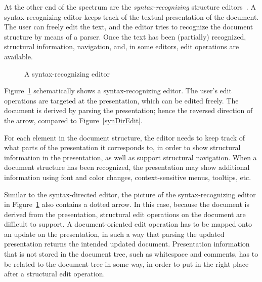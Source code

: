 
At the other end of the spectrum are the {\em syntax-recognizing} structure editors~\cite{budinsky85sre, ballance92pan}. A syntax-recognizing editor keeps track of the textual presentation of the document. The user can freely edit the text, and the editor tries to recognize the document structure by means of a parser. Once the text has been (partially) recognized, structural information, navigation, and, in some editors, edit operations are available.

\begin{figure}
\begin{small}
\begin{center}
\begin{center}
\begin{small}
\noindent
{}
\end{small}
\end{center}\caption{A syntax-recognizing editor}\label{synRecEdit} 
\end{center}
\end{small}
\end{figure}

Figure~\ref{synRecEdit} schematically shows a syntax-recognizing editor. The user's edit operations are targeted at the presentation, which can be edited freely. The document is derived by parsing the presentation; hence the reversed direction of the arrow, compared to Figure~\ref{synDirEdit}.

For each element in the document structure, the editor needs to keep track of what parts of the presentation it corresponds to, in order to show structural information in the presentation, as well as support structural navigation.  When a document structure has been recognized, the presentation may show additional information using font and color changes, context-sensitive menus, tooltips, etc.

Similar to the syntax-directed editor, the picture of the syntax-recognizing editor in Figure~\ref{synRecEdit} also contains a dotted arrow. In this case, because the document is derived from the presentation, structural edit operations on the document are difficult to support. A document-oriented edit operation has to be mapped onto an update on the presentation, in such a way that parsing the updated presentation returns the intended updated document. Presentation information that is not stored in the document tree, such as whitespace and comments, has to be related to the document tree in some way, in order to put in the right place after a structural edit operation.

